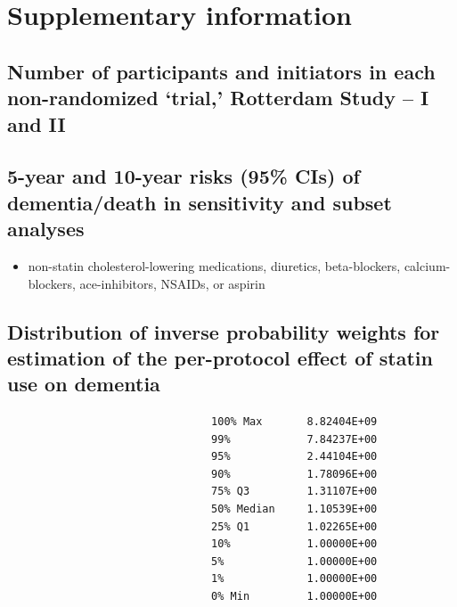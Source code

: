 \documentclass[
]{book}
\providecommand{\tightlist}{%
  \setlength{\itemsep}{0pt}\setlength{\parskip}{0pt}}
\begin{document}
\hypertarget{supplementary-information}{%
\section{Supplementary information}\label{supplementary-information}}

\hypertarget{number-of-participants-and-initiators-in-each-non-randomized-trial-rotterdam-study-i-and-ii}{%
\subsection{Number of participants and initiators in each non-randomized `trial,' Rotterdam Study -- I and II}\label{number-of-participants-and-initiators-in-each-non-randomized-trial-rotterdam-study-i-and-ii}}

\hypertarget{year-and-10-year-risks-95-cis-of-dementiadeath-in-sensitivity-and-subset-analyses}{%
\subsection{5-year and 10-year risks (95\% CIs) of dementia/death in sensitivity and subset analyses}\label{year-and-10-year-risks-95-cis-of-dementiadeath-in-sensitivity-and-subset-analyses}}

\begin{itemize}
\tightlist
\item
  non-statin cholesterol-lowering medications, diuretics, beta-blockers, calcium-blockers, ace-inhibitors, NSAIDs, or aspirin
\end{itemize}

\hypertarget{distribution-of-inverse-probability-weights-for-estimation-of-the-per-protocol-effect-of-statin-use-on-dementia}{%
\subsection{Distribution of inverse probability weights for estimation of the per-protocol effect of statin use on dementia}\label{distribution-of-inverse-probability-weights-for-estimation-of-the-per-protocol-effect-of-statin-use-on-dementia}}

\begin{verbatim}
                                100% Max       8.82404E+09
                                99%            7.84237E+00
                                95%            2.44104E+00
                                90%            1.78096E+00
                                75% Q3         1.31107E+00
                                50% Median     1.10539E+00
                                25% Q1         1.02265E+00
                                10%            1.00000E+00
                                5%             1.00000E+00
                                1%             1.00000E+00
                                0% Min         1.00000E+00
\end{verbatim}
\end{document}
